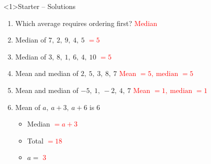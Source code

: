 \documentclass{beamer}
\begin{document}
\begin{frame}<1>{Starter -- Solutions}
\vspace{-0.8em}

\footnotesize
\begin{enumerate}\itemsep2pt
  \item Which average requires ordering first?  
        \textcolor{red}{Median}
  \item Median of $7,\ 2,\ 9,\ 4,\ 5$  
        \textcolor{red}{$=5$}
  \item Median of $3,\ 8,\ 1,\ 6,\ 4,\ 10$  
        \textcolor{red}{$=5$}
  \item Mean and median of $2,\ 5,\ 3,\ 8,\ 7$  
        \textcolor{red}{Mean $=5,\ \text{median }=5$}
  \item Mean and median of $-5,\ 1,\ -2,\ 4,\ 7$  
        \textcolor{red}{Mean $=1,\ \text{median }=1$}
  \item Mean of $a,\ a+3,\ a+6$ is $6$
        \begin{itemize}\footnotesize
          \item Median \textcolor{red}{$=a+3$}
          \item Total \textcolor{red}{$=18$}
          \item $a=$ \textcolor{red}{$3$}
        \end{itemize}
\end{enumerate}
\end{frame}
\end{document}
